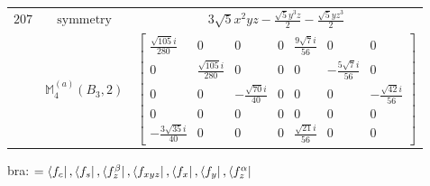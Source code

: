 \documentclass[fleqn,8pt,landscape]{jsarticle}
\begin{document}
\begin{longtable}{ccc}
$ 207 $ & $ \text{symmetry} $ & $ 3 \sqrt{5} x^{2} y z - \frac{\sqrt{5} y^{3} z}{2} - \frac{\sqrt{5} y z^{3}}{2} $ \\
$  $ & $ \mathbb{M}_{4}^{(a)}(B_{3},2) $ & $ \begin{bmatrix} \frac{\sqrt{105} i}{280} & 0 & 0 & 0 & \frac{9 \sqrt{7} i}{56} & 0 & 0 \\ 0 & \frac{\sqrt{105} i}{280} & 0 & 0 & 0 & - \frac{5 \sqrt{7} i}{56} & 0 \\ 0 & 0 & - \frac{\sqrt{70} i}{40} & 0 & 0 & 0 & - \frac{\sqrt{42} i}{56} \\ 0 & 0 & 0 & 0 & 0 & 0 & 0 \\ - \frac{3 \sqrt{35} i}{40} & 0 & 0 & 0 & \frac{\sqrt{21} i}{56} & 0 & 0 \end{bmatrix} $ \\ \hline
\end{longtable}
bra: $=\bra{f_{c}}, \bra{f_{s}}, \bra{f_{z}^{\beta}}, \bra{f_{xyz}}, \bra{f_{x}}, \bra{f_{y}}, \bra{f_{z}^{\alpha}}$
\end{document}
